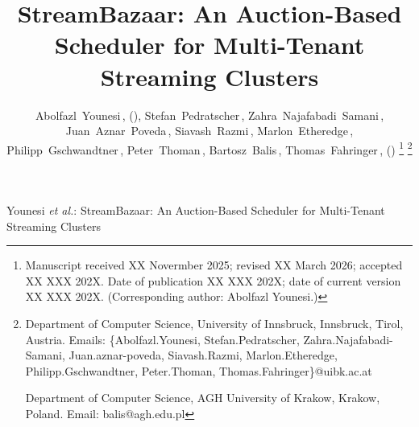 \documentclass[lettersize,journal]{IEEEtran}
\begin{document}
\title{StreamBazaar: An Auction-Based Scheduler for Multi-Tenant Streaming Clusters}

\author{Abolfazl~Younesi\,, (),
Stefan~Pedratscher\,,
Zahra~Najafabadi~Samani\,,
Juan~Aznar~Poveda\,,
Siavash~Razmi\,,
Marlon~Etheredge\,,
Philipp~Gschwandtner\,,
Peter~Thoman\,,
Bartosz~Balis\,,
Thomas~Fahringer\,, ()
\thanks{Manuscript received XX Novermber 2025; revised XX March 2026; accepted XX XXX 202X. 
Date of publication XX XXX 202X; date of current version XX XXX 202X. (Corresponding author: Abolfazl Younesi.)}
\thanks{Department of Computer Science, University of Innsbruck, Innsbruck, Tirol, Austria.  
Emails: 
\{Abolfazl.Younesi, Stefan.Pedratscher, Zahra.Najafabadi-Samani, Juan.aznar-poveda, 
Siavash.Razmi, Marlon.Etheredge, Philipp.Gschwandtner, Peter.Thoman, Thomas.Fahringer\}@uibk.ac.at

Department of Computer Science, AGH University of Krakow, Krakow, Poland.  
Email: balis@agh.edu.pl}}

{Younesi \MakeLowercase{\textit{et al.}}: StreamBazaar: An Auction-Based Scheduler for Multi-Tenant Streaming Clusters}


\maketitle
\end{document}
